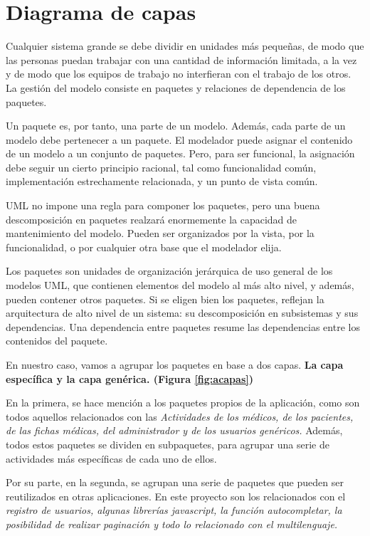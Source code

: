 \section{Diagrama de capas} %
\label{sec:diagrama_de_capas}

	Cualquier sistema grande se debe dividir en unidades más pequeñas, de modo que las personas puedan trabajar con una cantidad de información limitada, a la vez y de modo que los equipos de trabajo no interfieran con el trabajo de los otros. La gestión del modelo consiste en paquetes y relaciones de dependencia de los paquetes.
	
	Un paquete es, por tanto, una parte de un modelo. Además, cada parte de un modelo debe pertenecer a un paquete. El modelador puede asignar el contenido de un modelo a un conjunto de paquetes. Pero, para ser funcional, la asignación debe seguir un cierto principio racional, tal como funcionalidad común, implementación estrechamente relacionada, y un punto de vista común.
	
	UML no impone una regla para componer los paquetes, pero una buena descomposición en paquetes realzará enormemente la capacidad de mantenimiento del modelo. Pueden ser organizados por la vista, por la funcionalidad, o por cualquier otra base que el modelador elija.
	
	Los paquetes son unidades de organización jerárquica de uso general de los modelos UML, que contienen elementos del modelo al más alto nivel, y además, pueden contener otros paquetes. Si se eligen bien los paquetes, reflejan la arquitectura de alto nivel de un sistema: su descomposición en subsistemas y sus dependencias. Una dependencia entre paquetes resume las dependencias entre los contenidos del paquete.
	
	En nuestro caso, vamos a agrupar los paquetes en base a dos capas. \textbf{La capa específica y la capa genérica. (Figura \ref{fig:acapas})} 
	
	En la primera, se hace mención a los paquetes propios de la aplicación, como son todos aquellos relacionados con las \textit{Actividades de los médicos, de los pacientes, de las fichas médicas, del administrador y de los usuarios genéricos.} Además, todos estos paquetes se dividen en subpaquetes, para agrupar una serie de actividades más específicas de cada uno de ellos. 
	
	Por su parte, en la segunda, se agrupan una serie de paquetes que pueden ser reutilizados en otras aplicaciones. En este proyecto son los relacionados con el \textit{registro de usuarios, algunas librerías javascript, la función autocompletar, la posibilidad de realizar paginación y todo lo relacionado con el multilenguaje.}
	
